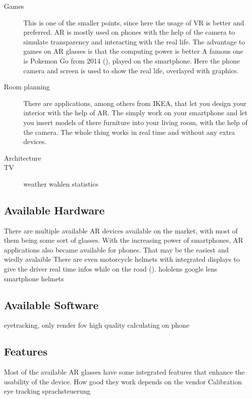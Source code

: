 \documentclass[11pt,a4paper]{article}
\begin{document}
\begin{description}
		\item[Games]
		This is one of the smaller points, since here the usage of VR is better and preferred. AR is mostly used on phones with the help of the camera to simulate transparency and interacting with the real life. The advantage to games on AR glasses is that the computing power is better A famous one is Pokemon Go from 2014 (), played on the smartphone. Here the phone camera and screen is used to show the real life, overlayed with graphics. 
		\item[Room planning]
		There are applications, among others from IKEA, that let you design your interior with the help of AR. The simply work on your smartphone and let you insert models of there furniture into your living room, with the help of the camera. The whole thing works in real time  and without any extra devices. 
		\item[Architecture] 
		\item[TV]
		weather
		wahlen
		statistics
		
	\end{description}
	
	\subsection{Available Hardware}
	There are multiple available AR devices available on the market, with most of them being some sort of glasses. With the increasing power of smartphones, AR applications also became available for phones. That may be the easiest and wiedly avalaible There are even motorcycle helmets with integrated displays to give the driver real time infos while on the road ().  
	hololens
	google lens
	smartphone
	helmets
		
	\subsection{Available Software}
	eyetracking, only render fov high quality
	calculating on phone
	
	
	\subsection{Features}
	Most of the available AR glasses have some integrated features that enhance the usability of the device. How good they work depends on the vendor 
	Calibration
	eye tracking
	sprachsteuerung
	
\end{document}
